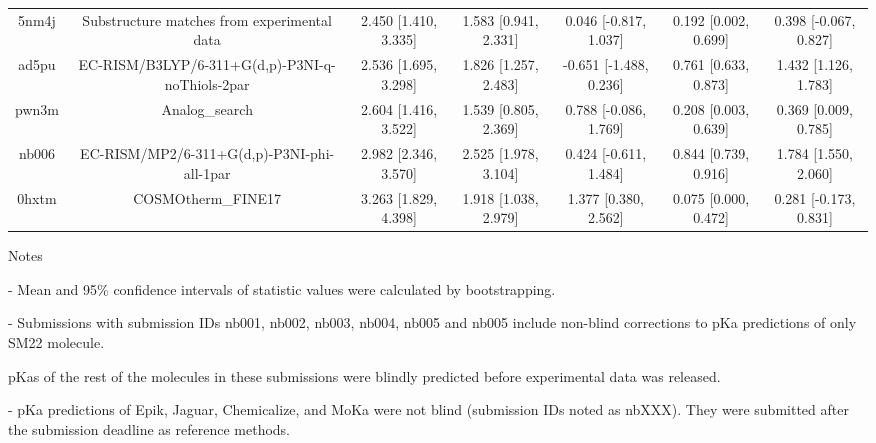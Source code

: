 \documentclass{article}
\begin{document}
\begin{center}
\begin{longtable}{|ccccccc|}
 5nm4j &        Substructure matches from experimental data &  2.450 [1.410, 3.335] &  1.583 [0.941, 2.331] &    0.046 [-0.817, 1.037] &  0.192 [0.002, 0.699] &  0.398 [-0.067, 0.827] \\
 ad5pu &    EC-RISM/B3LYP/6-311+G(d,p)-P3NI-q-noThiols-2par &  2.536 [1.695, 3.298] &  1.826 [1.257, 2.483] &   -0.651 [-1.488, 0.236] &  0.761 [0.633, 0.873] &   1.432 [1.126, 1.783] \\
 pwn3m &                                     Analog\_search &  2.604 [1.416, 3.522] &  1.539 [0.805, 2.369] &    0.788 [-0.086, 1.769] &  0.208 [0.003, 0.639] &   0.369 [0.009, 0.785] \\
 nb006 &         EC-RISM/MP2/6-311+G(d,p)-P3NI-phi-all-1par &  2.982 [2.346, 3.570] &  2.525 [1.978, 3.104] &    0.424 [-0.611, 1.484] &  0.844 [0.739, 0.916] &   1.784 [1.550, 2.060] \\
 0hxtm &                                 COSMOtherm\_FINE17 &  3.263 [1.829, 4.398] &  1.918 [1.038, 2.979] &     1.377 [0.380, 2.562] &  0.075 [0.000, 0.472] &  0.281 [-0.173, 0.831] \\
\end{longtable}
\end{center}

Notes

- Mean and 95\% confidence intervals of statistic values were calculated by bootstrapping.

- Submissions with submission IDs nb001, nb002, nb003, nb004, nb005 and nb005 include non-blind corrections to pKa predictions of only SM22 molecule.

pKas of the rest of the molecules in these submissions were blindly predicted before experimental data was released.

- pKa predictions of Epik, Jaguar, Chemicalize, and MoKa were not blind (submission IDs noted as nbXXX). They were submitted after the submission deadline as reference methods.
\end{document}
